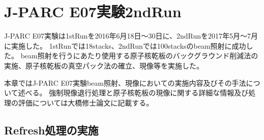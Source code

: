 \documentclass[12pt,a4paper]{jarticle}
\begin{document}
\newpage
\section{J-PARC E07実験2ndRun}
J-PARC E07実験は1stRunを2016年6月18日〜30日に、2ndRunを2017年5月～7月に実施した。
1stRunでは18stacks、2ndRunでは100stacksのbeam照射に成功した。
beam照射を行うにあたり使用する原子核乾板のバックグラウンド削減法の実施、原子核乾板の真空パック法の確立、現像等を実施した。
\par
本章ではJ-PARC E07実験beam照射、現像においての実施内容及びその手法について述べる。
強制現像退行処理と原子核乾板の現像に関する詳細な情報及び処理の評価については大橋修士論文に記載する。
\subsection{Refresh処理の実施}
\end{document}
